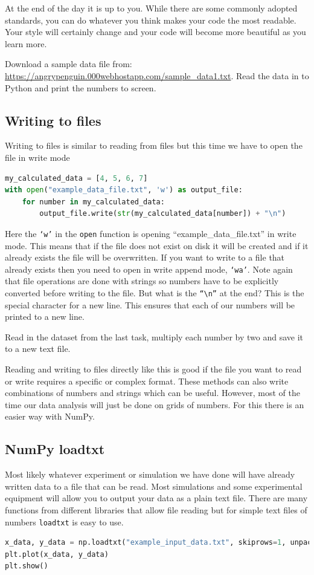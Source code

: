 At the end of the day it is up to you. While there are some commonly adopted standards, you can do whatever you think makes your code the most readable. Your style will certainly change and your code will become more beautiful as you learn more.

\begin{task}Download a sample data file from: \url{https://angrypenguin.000webhostapp.com/sample_data1.txt}. Read the data in to Python and print the numbers to screen.\end{task}

	\subsection{Writing to files}
		Writing to files is similar to reading from files but this time we have to open the file in write mode
		\begin{lstlisting}[language=Python]
my_calculated_data = [4, 5, 6, 7]
with open("example_data_file.txt", 'w') as output_file:
	for number in my_calculated_data:
		output_file.write(str(my_calculated_data[number]) + "\n")
\end{lstlisting}	
	Here the \texttt{`w'} in the \texttt{open} function is opening ``example\_data\_file.txt'' in write mode. This means that if the file does not exist on disk it will be created and if it already exists the file will be overwritten. If you want to write to a file that already exists then you need to open in write append mode, \texttt{`wa'}.
Note again that file operations are done with strings so numbers have to be explicitly converted before writing to the file. But what is the \texttt{``\textbackslash{}n''} at the end? This is the special character for a new line. This ensures that each of our numbers will be printed to a new line.

\begin{task}Read in the dataset from the last task, multiply each number by two and save it to a new text file.\end{task}

Reading and writing to files directly like this is good if the file you want to read or write requires a specific or complex format. These methods can also write combinations of numbers and strings which can be useful. However, most of the time our data analysis will just be done on grids of numbers. For this there is an easier way with NumPy.

	\subsection{NumPy loadtxt}
		Most likely whatever experiment or simulation we have done will have already written data to a file that can be read. Most simulations and some experimental equipment will allow you to output your data as a plain text file. There are many functions from different libraries that allow file reading but for simple text files of numbers \texttt{loadtxt} is easy to use.
		\begin{lstlisting}[language=Python]
x_data, y_data = np.loadtxt("example_input_data.txt", skiprows=1, unpack=True)
plt.plot(x_data, y_data)
plt.show()\end{lstlisting}

